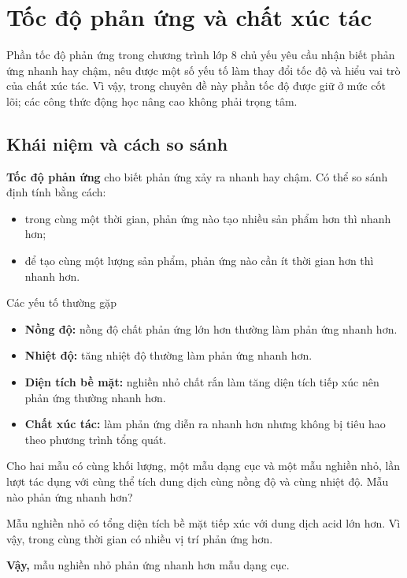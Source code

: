 \section{Tốc độ phản ứng và chất xúc tác}

Phần tốc độ phản ứng trong chương trình lớp 8 chủ yếu yêu cầu nhận biết phản ứng nhanh hay chậm, nêu được một số yếu tố làm thay đổi tốc độ và hiểu vai trò của chất xúc tác. Vì vậy, trong chuyên đề này phần tốc độ được giữ ở mức cốt lõi; các công thức động học nâng cao không phải trọng tâm.

\subsection{Khái niệm và cách so sánh}

\textbf{Tốc độ phản ứng} cho biết phản ứng xảy ra nhanh hay chậm. Có thể so sánh định tính bằng cách:
\begin{itemize}
\item trong cùng một thời gian, phản ứng nào tạo nhiều sản phẩm hơn thì nhanh hơn;
\item để tạo cùng một lượng sản phẩm, phản ứng nào cần ít thời gian hơn thì nhanh hơn.
\end{itemize}

\begin{ghinho}{Các yếu tố thường gặp}
\begin{itemize}
\item \textbf{Nồng độ:} nồng độ chất phản ứng lớn hơn thường làm phản ứng nhanh hơn.
\item \textbf{Nhiệt độ:} tăng nhiệt độ thường làm phản ứng nhanh hơn.
\item \textbf{Diện tích bề mặt:} nghiền nhỏ chất rắn làm tăng diện tích tiếp xúc nên phản ứng thường nhanh hơn.
\item \textbf{Chất xúc tác:} làm phản ứng diễn ra nhanh hơn nhưng không bị tiêu hao theo phương trình tổng quát.
\end{itemize}
\end{ghinho}

\begin{vidu}
Cho hai mẫu  có cùng khối lượng, một mẫu dạng cục và một mẫu nghiền nhỏ, lần lượt tác dụng với cùng thể tích dung dịch  cùng nồng độ và cùng nhiệt độ. Mẫu nào phản ứng nhanh hơn?
\end{vidu}
\begin{loigiai}
Mẫu nghiền nhỏ có tổng diện tích bề mặt tiếp xúc với dung dịch acid lớn hơn. Vì vậy, trong cùng thời gian có nhiều vị trí phản ứng hơn.

\textbf{Vậy,} mẫu  nghiền nhỏ phản ứng nhanh hơn mẫu dạng cục.
\end{loigiai}


